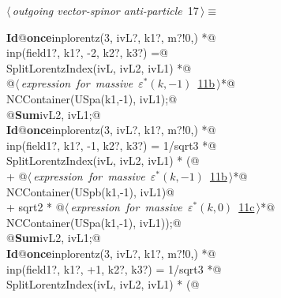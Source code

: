 \documentclass[a4paper,12pt]{amsart}
\renewcommand{\NWtarget}[2]{\hypertarget{#1}{#2}}
\renewcommand{\NWlink}[2]{\hyperlink{#1}{#2}}
\begin{document}
\begin{flushleft} \small
\begin{minipage}{\linewidth}\label{scrap36}\raggedright\small
\NWtarget{nuweb17}{} $\langle\,${\itshape outgoing vector-spinor anti-particle}\nobreak\ {\footnotesize {17}}$\,\rangle\equiv$
\vspace{-1ex}
\begin{list}{}{} \item
\mbox{}\verb@@\hbox{\sffamily\bfseries Id}\verb@ @\hbox{\sffamily\bfseries once}\verb@ inplorentz(3, ivL?, k1?, m?!{0,}) *@\\
\mbox{}\verb@      inp(field1?, k1?, -2, k2?, k3?) =@\\
\mbox{}\verb@   SplitLorentzIndex(ivL, ivL2, ivL1) *@\\
\mbox{}\verb@   @\hbox{$\langle\,${\itshape expression for massive $\varepsilon^\ast(k, -1)$}\nobreak\ {\footnotesize \NWlink{nuweb11b}{11b}}$\,\rangle$}\verb@ *@\\
\mbox{}\verb@   NCContainer(USpa(k1,-1), ivL1);@\\
\mbox{}\verb@   @\hbox{\sffamily\bfseries Sum}\verb@ ivL2, ivL1;@\\
\mbox{}\verb@@\hbox{\sffamily\bfseries Id}\verb@ @\hbox{\sffamily\bfseries once}\verb@ inplorentz(3, ivL?, k1?, m?!{0,}) *@\\
\mbox{}\verb@      inp(field1?, k1?, -1, k2?, k3?) = 1/sqrt3 *@\\
\mbox{}\verb@   SplitLorentzIndex(ivL, ivL2, ivL1) * (@\\
\mbox{}\verb@   + @\hbox{$\langle\,${\itshape expression for massive $\varepsilon^\ast(k, -1)$}\nobreak\ {\footnotesize \NWlink{nuweb11b}{11b}}$\,\rangle$}\verb@ *@\\
\mbox{}\verb@     NCContainer(USpb(k1,-1), ivL1)@\\
\mbox{}\verb@   + sqrt2 * @\hbox{$\langle\,${\itshape expression for massive $\varepsilon^\ast(k, 0)$}\nobreak\ {\footnotesize \NWlink{nuweb11c}{11c}}$\,\rangle$}\verb@ *@\\
\mbox{}\verb@     NCContainer(USpa(k1,-1), ivL1));@\\
\mbox{}\verb@   @\hbox{\sffamily\bfseries Sum}\verb@ ivL2, ivL1;@\\
\mbox{}\verb@@\hbox{\sffamily\bfseries Id}\verb@ @\hbox{\sffamily\bfseries once}\verb@ inplorentz(3, ivL?, k1?, m?!{0,}) *@\\
\mbox{}\verb@      inp(field1?, k1?, +1, k2?, k3?) = 1/sqrt3 *@\\
\mbox{}\verb@   SplitLorentzIndex(ivL, ivL2, ivL1) * (@\\

\end{list}
\end{minipage}
\end{flushleft}
\end{document}
